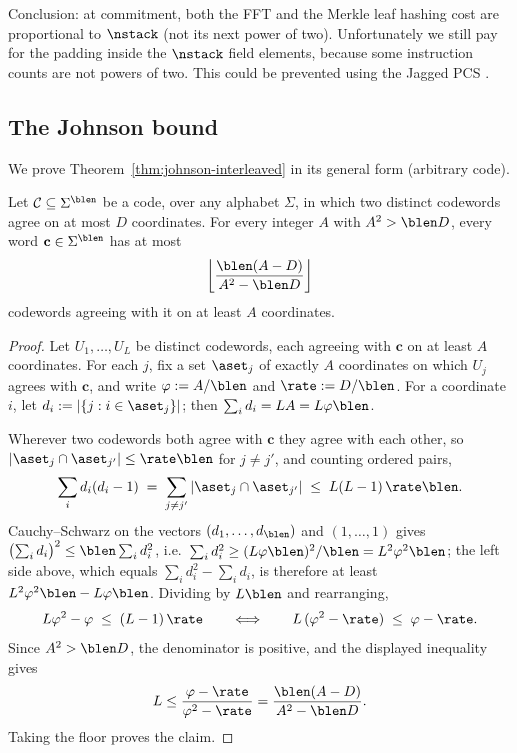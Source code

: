 Conclusion: at commitment, both the FFT and the Merkle leaf hashing cost are proportional to $\nstack$ (not its next power of two). Unfortunately we still pay for the padding inside the $\nstack$ field elements, because some instruction counts are not powers of two. This could be prevented using the Jagged PCS \cite{jagged_pcs}.


\subsection{The Johnson bound}\label{app:johnson}

We prove Theorem~\ref{thm:johnson-interleaved} in its general form (arbitrary code).

\begin{theorem}\label{thm:johnson-general}
Let $\mathcal{C} \subseteq \Sigma^\blen$ be a code, over any alphabet $\Sigma$, in which two distinct codewords agree on at most $D$ coordinates. For every integer $A$ with $A^2>\blen D$, every word $\mathbf{c} \in \Sigma^\blen$ has at most
\[
 \left\lfloor\frac{\blen(A-D)}{A^2-\blen D}\right\rfloor
\]
codewords agreeing with it on at least $A$ coordinates.
\end{theorem}

\begin{proof}
Let $U_1, \dots, U_L$ be distinct codewords, each agreeing with $\mathbf{c}$ on at least $A$ coordinates. For each $j$, fix a set $\aset_j$ of exactly $A$ coordinates on which $U_j$ agrees with $\mathbf{c}$, and write $\varphi:=A/\blen$ and $\rate:=D/\blen$. For a coordinate $i$, let $d_i := |\{ j : i \in \aset_j \}|$; then $\sum_i d_i = LA=L\varphi\blen$.

Wherever two codewords both agree with $\mathbf{c}$ they agree with each other, so $|\aset_j \cap \aset_{j'}| \le \rate \blen$ for $j \neq j'$, and counting ordered pairs,
\[
\sum_i d_i (d_i - 1) \;=\; \sum_{j \neq j'} |\aset_j \cap \aset_{j'}| \;\le\; L(L-1)\, \rate \blen .
\]
Cauchy--Schwarz on the vectors $(d_1, \dots, d_\blen)$ and $(1, \dots, 1)$ gives $\bigl(\sum_i d_i\bigr)^2 \le \blen \sum_i d_i^2$, i.e.\ $\sum_i d_i^2 \ge (L \varphi \blen)^2 / \blen = L^2 \varphi^2 \blen$; the left side above, which equals $\sum_i d_i^2 - \sum_i d_i$, is therefore at least $L^2 \varphi^2 \blen - L \varphi \blen$. Dividing by $L\blen$ and rearranging,
\[
L \varphi^2 - \varphi \;\le\; (L-1)\, \rate
\qquad\Longleftrightarrow\qquad
L\, (\varphi^2 - \rate) \;\le\; \varphi - \rate .
\]
Since $A^2>\blen D$, the denominator is positive, and the displayed inequality gives
\[
 L\le\frac{\varphi-\rate}{\varphi^2-\rate}=\frac{\blen(A-D)}{A^2-\blen D}.
\]
Taking the floor proves the claim.
\end{proof}
